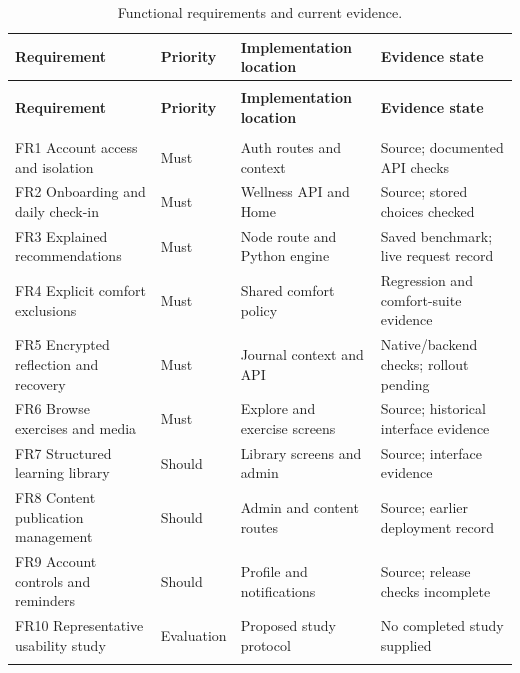 \begin{longtable}{@{}>{\raggedright\arraybackslash}p{0.200\TableInnerWidth} >{\raggedright\arraybackslash}p{0.300\TableInnerWidth} >{\raggedright\arraybackslash}p{0.260\TableInnerWidth} >{\raggedright\arraybackslash}p{0.240\TableInnerWidth}@{}}
\caption{Functional requirements and current evidence.}\label{tab:table-1}\\
\toprule
\textbf{Requirement} & \textbf{Priority} & \textbf{Implementation location} & \textbf{Evidence state} \\
\midrule\endfirsthead
\multicolumn{4}{l}{\textit{Table \thetable\ continued}}\\
\toprule
\textbf{Requirement} & \textbf{Priority} & \textbf{Implementation location} & \textbf{Evidence state} \\
\midrule\endhead
\midrule\multicolumn{4}{r}{\textit{Continued on next page}}\\\endfoot
\bottomrule\endlastfoot
FR1 Account access and isolation & Must & Auth routes and context & Source; documented API checks \\ \addlinespace[4pt]
FR2 Onboarding and daily check-in & Must & Wellness API and Home & Source; stored choices checked \\ \addlinespace[4pt]
FR3 Explained recommendations & Must & Node route and Python engine & Saved benchmark; live request record \\ \addlinespace[4pt]
FR4 Explicit comfort exclusions & Must & Shared comfort policy & Regression and comfort-suite evidence \\ \addlinespace[4pt]
FR5 Encrypted reflection and recovery & Must & Journal context and API & Native/\allowbreak{}backend checks; rollout pending \\ \addlinespace[4pt]
FR6 Browse exercises and media & Must & Explore and exercise screens & Source; historical interface evidence \\ \addlinespace[4pt]
FR7 Structured learning library & Should & Library screens and admin & Source; interface evidence \\ \addlinespace[4pt]
FR8 Content publication management & Should & Admin and content routes & Source; earlier deployment record \\ \addlinespace[4pt]
FR9 Account controls and reminders & Should & Profile and notifications & Source; release checks incomplete \\ \addlinespace[4pt]
FR10 Representative usability study & Evaluation & Proposed study protocol & No completed study supplied \\ \addlinespace[4pt]
\end{longtable}
\endgroup

